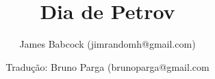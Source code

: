 \documentclass{article}
\begin{document}
\author{James Babcock (jimrandomh@gmail.com)}
\author{Tradu\c{c}\~{a}o: Bruno Parga (brunoparga@gmail.com}
\title{Dia de Petrov}


%



\end{document}
